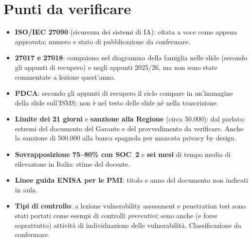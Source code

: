 \section{Punti da verificare}
\label{sec:iso-verifica}
\begin{verifica}
\begin{itemize}
  \item \textbf{ISO/IEC 27090} (sicurezza dei sistemi di IA): citata a voce come appena approvata; numero e
    stato di pubblicazione da confermare.
  \item \textbf{27017 e 27018}: compaiono nel diagramma della famiglia nelle slide (secondo gli appunti di
    recupero) e negli appunti 2025/26, ma non sono state commentate a lezione quest'anno.
  \item \textbf{PDCA}: secondo gli appunti di recupero il ciclo compare in un'immagine della slide sull'ISMS;
    non è nel testo delle slide né nella trascrizione.
  \item \textbf{Limite dei 21 giorni} e \textbf{sanzione alla Regione} (circa \texteuro{}50.000): dal parlato;
    estremi del documento del Garante e del provvedimento da verificare. Anche la sanzione di
    \texteuro{}500.000 alla banca spagnola per mancata privacy by design.
  \item \textbf{Sovrapposizione 75--80\% con SOC~2} e \textbf{sei mesi} di tempo medio di rilevazione in
    Italia: stime del docente.
  \item \textbf{Linee guida ENISA per le PMI}: titolo e anno del documento non indicati in aula.
  \item \textbf{Tipi di controllo}: a lezione vulnerability assessment e penetration test sono stati
    portati come esempi di controlli \emph{preventivi}; sono anche (e forse soprattutto) attività di
    individuazione delle vulnerabilità. Classificazione da confermare.
\end{itemize}
\end{verifica}
